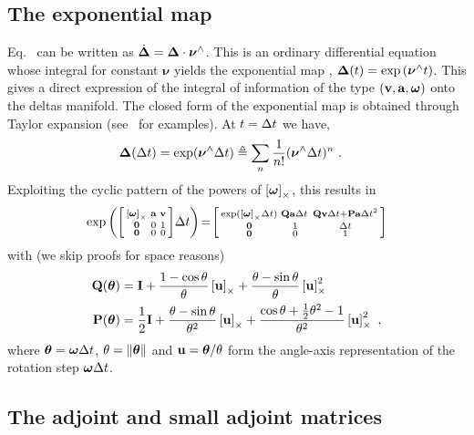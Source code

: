 \subsection{The exponential map}

Eq.~ can be written as $\dot{{{\bm \Delta}}}={{\bm \Delta}}\cdot\bm\nu^\wedge$.
This is an ordinary differential equation whose  integral for constant $\bm\nu$ yields the exponential map \cite{sola2018micro}, $ {{\bm \Delta}}(t) = \exp\left(\bm\nu^\wedge t\right)$.
This gives a direct expression of the integral of information of the type $({\bf v},{\bf a},{{\bm \omega}})$ onto the deltas manifold. %
The closed form of the exponential map is obtained through Taylor expansion (see \eg \cite{sola2018micro}\ for examples). 
At $t=\Delta t$ we have,
%
\begin{align}
{{\bm \Delta}}(\Delta t) 
&= \exp(\bm\nu^\wedge\Delta t) \triangleq \sum_n \frac1{n!}(\bm\nu^\wedge\Delta t)^n
~.
\end{align}
%
%
Exploiting the cyclic pattern of the powers of $\left[{{\bm \omega}}\right]_\times$, this results in
%
\begin{align}
\exp\left(\begin{bsmallmatrix}
\left[{{\bm \omega}}\right]_\times & {\bf a} & {\bf v} \\
\bf0 & 0 & 1 \\
\bf0 & 0 & 0 
\end{bsmallmatrix}\Delta t\right) 
\!=\! \begin{bsmallmatrix}
\exp(\left[{{\bm \omega}}\right]_\times\Delta t) & {\bf Q}{\bf a}\Delta t\, & {\bf Q}{\bf v}\Delta t+{\bf P}{\bf a}\Delta t^2 \\
\bf0 & 1 & \Delta t \\
\bf0 & 0 & 1
\end{bsmallmatrix}
\end{align}
%
with (we skip proofs for space reasons)
%
\begin{align} \label{eq:RQP}
{\bf Q} ({{\bm \theta}})
 &= 
  {\bf I} + \frac{1-\cos\theta}{\theta}\left[{\bf u}\right]_\times + \frac{\theta-\sin\theta}{\theta}\left[{\bf u}\right]_\times^2\\
{\bf P} ({{\bm \theta}})
 &= 
  \frac12{\bf I} 
   + \frac{\theta-\sin\theta}{\theta^2}\left[{\bf u}\right]_\times 
   + \frac{\cos\theta + \frac12\theta^2 - 1}{\theta^2}\left[{\bf u}\right]_\times^2
~,
\end{align}
%
where  ${{\bm \theta}}={{\bm \omega}}\Delta t$, $\theta={\left\|{{\bm \theta}}\right\|}$ and ${\bf u}={{\bm \theta}}/\theta$ form the angle-axis representation of the rotation step ${{\bm \omega}}\Delta t$. 


\subsection{The adjoint and small adjoint matrices}
\label{sec:imu_compact_adjoint}

